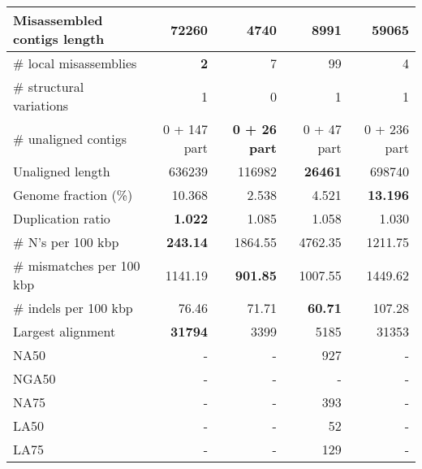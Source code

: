\documentclass[12pt,a4paper]{article}
\begin{document}
\begin{table}[ht]
\begin{center}
\begin{tabular}{|l*{4}{|r}|}
Misassembled contigs length & 72260 & {\bf 4740} & 8991 & 59065 \\ \hline
\# local misassemblies & {\bf 2} & 7 & 99 & 4 \\ \hline
\# structural variations & 1 & 0 & 1 & 1 \\ \hline
\# unaligned contigs & 0 + 147 part & {\bf 0 + 26 part} & 0 + 47 part & 0 + 236 part \\ \hline
Unaligned length & 636239 & 116982 & {\bf 26461} & 698740 \\ \hline
Genome fraction (\%) & 10.368 & 2.538 & 4.521 & {\bf 13.196} \\ \hline
Duplication ratio & {\bf 1.022} & 1.085 & 1.058 & 1.030 \\ \hline
\# N's per 100 kbp & {\bf 243.14} & 1864.55 & 4762.35 & 1211.75 \\ \hline
\# mismatches per 100 kbp & 1141.19 & {\bf 901.85} & 1007.55 & 1449.62 \\ \hline
\# indels per 100 kbp & 76.46 & 71.71 & {\bf 60.71} & 107.28 \\ \hline
Largest alignment & {\bf 31794} & 3399 & 5185 & 31353 \\ \hline
NA50 & - & - & 927 & - \\ \hline
NGA50 & - & - & - & - \\ \hline
NA75 & - & - & 393 & - \\ \hline
LA50 & - & - & 52 & - \\ \hline
LA75 & - & - & 129 & - \\ \hline
\end{tabular}
\end{center}
\end{table}
\end{document}
